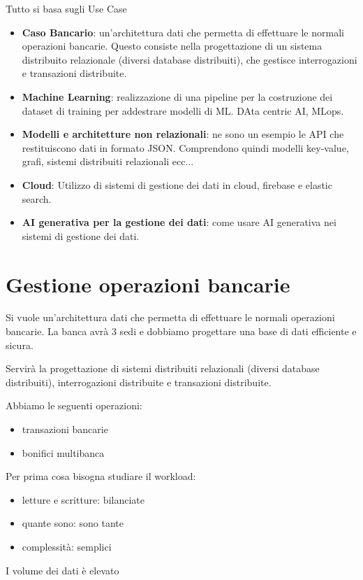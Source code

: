 Tutto si basa sugli Use Case
\begin{itemize}
    \item \textbf{Caso Bancario}: un'architettura dati che permetta di effettuare
          le normali operazioni bancarie. Questo consiste nella progettazione di
          un sistema distribuito relazionale (diversi database distribuiti), che
          gestisce interrogazioni e transazioni distribuite.
    \item \textbf{Machine Learning}: realizzazione di una pipeline per la
          costruzione dei dataset di training per addestrare modelli di ML.
          DAta centric AI, MLops.
    \item \textbf{Modelli e architetture non relazionali}: ne sono un esempio
          le API che restituiscono dati in formato JSON. Comprendono quindi
          modelli key-value, grafi, sistemi distribuiti relazionali ecc...
    \item \textbf{Cloud}: Utilizzo di sistemi di gestione dei dati in cloud,
          firebase e elastic search.
    \item \textbf{AI generativa per la gestione dei dati}: come usare AI
          generativa nei sistemi di gestione dei dati.
\end{itemize}
\section{Gestione operazioni bancarie}
Si vuole un'architettura dati che permetta di effettuare le normali operazioni
bancarie. La banca avrà $3$ sedi e dobbiamo progettare una base di dati efficiente 
e sicura.

Servirà la progettazione di sistemi distribuiti relazionali (diversi
database distribuiti), interrogazioni distribuite e transazioni distribuite.

Abbiamo le seguenti operazioni:
\begin{itemize}
    \item transazioni bancarie
    \item bonifici multibanca
\end{itemize}
Per prima cosa bisogna studiare il workload:
\begin{itemize}
    \item letture e scritture: bilanciate
    \item quante sono: sono tante
    \item complessità: semplici
\end{itemize}
I volume dei dati è elevato

